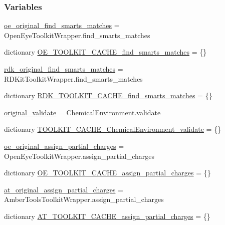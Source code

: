 \subsubsection*{Variables}
\begin{DoxyCompactItemize}
\item 
\hyperlink{namespacesrc_1_1smirnoff__hack_a236e7f8147ed4f9056ac56995647906a}{oe\+\_\+original\+\_\+find\+\_\+smarts\+\_\+matches} = Open\+Eye\+Toolkit\+Wrapper.\+find\+\_\+smarts\+\_\+matches
\item 
dictionary \hyperlink{namespacesrc_1_1smirnoff__hack_afe9833702ec79b7b6b1826c058ac9d97}{O\+E\+\_\+\+T\+O\+O\+L\+K\+I\+T\+\_\+\+C\+A\+C\+H\+E\+\_\+find\+\_\+smarts\+\_\+matches} = \{\}
\item 
\hyperlink{namespacesrc_1_1smirnoff__hack_ab122365efed26a2cfdbbb3cdd6c9034d}{rdk\+\_\+original\+\_\+find\+\_\+smarts\+\_\+matches} = R\+D\+Kit\+Toolkit\+Wrapper.\+find\+\_\+smarts\+\_\+matches
\item 
dictionary \hyperlink{namespacesrc_1_1smirnoff__hack_a4272017b1ca5a7c2ab40dac276b5347c}{R\+D\+K\+\_\+\+T\+O\+O\+L\+K\+I\+T\+\_\+\+C\+A\+C\+H\+E\+\_\+find\+\_\+smarts\+\_\+matches} = \{\}
\item 
\hyperlink{namespacesrc_1_1smirnoff__hack_ab9e8d8a217b3be47f24ad7aee33f6644}{original\+\_\+validate} = Chemical\+Environment.\+validate
\item 
dictionary \hyperlink{namespacesrc_1_1smirnoff__hack_a887e1c7517dbd8993a1bc5e9e1e1c095}{T\+O\+O\+L\+K\+I\+T\+\_\+\+C\+A\+C\+H\+E\+\_\+\+Chemical\+Environment\+\_\+validate} = \{\}
\item 
\hyperlink{namespacesrc_1_1smirnoff__hack_aefab40272144d78f244beb311d07b80f}{oe\+\_\+original\+\_\+assign\+\_\+partial\+\_\+charges} = Open\+Eye\+Toolkit\+Wrapper.\+assign\+\_\+partial\+\_\+charges
\item 
dictionary \hyperlink{namespacesrc_1_1smirnoff__hack_aebca5fb9ee82f22e0521fbccc181b495}{O\+E\+\_\+\+T\+O\+O\+L\+K\+I\+T\+\_\+\+C\+A\+C\+H\+E\+\_\+assign\+\_\+partial\+\_\+charges} = \{\}
\item 
\hyperlink{namespacesrc_1_1smirnoff__hack_a0d0779c4736b17726a70a7298d4f8dd3}{at\+\_\+original\+\_\+assign\+\_\+partial\+\_\+charges} = Amber\+Tools\+Toolkit\+Wrapper.\+assign\+\_\+partial\+\_\+charges
\item 
dictionary \hyperlink{namespacesrc_1_1smirnoff__hack_a3534f16d6fcb29258bb1594230fd33fc}{A\+T\+\_\+\+T\+O\+O\+L\+K\+I\+T\+\_\+\+C\+A\+C\+H\+E\+\_\+assign\+\_\+partial\+\_\+charges} = \{\}
\item 

\end{DoxyCompactItemize}
